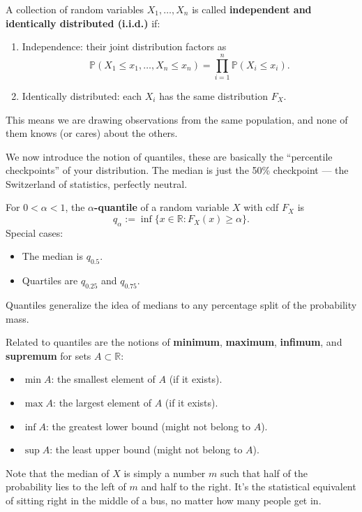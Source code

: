 \begin{definition}
A collection of random variables $X_1,\dots,X_n$ is called \textbf{independent and identically distributed (i.i.d.)} if:
\begin{enumerate}
\item Independence: their joint distribution factors as
\[
\mathbb{P}(X_1 \leq x_1, \dots, X_n \leq x_n) = \prod_{i=1}^n \mathbb{P}(X_i \leq x_i).
\]
\item Identically distributed: each $X_i$ has the same distribution $F_X$.
\end{enumerate}
This means we are drawing observations from the same population, and none of them knows (or cares) about the others. 
\end{definition}

We now introduce the notion of quantiles, these are basically the “percentile checkpoints” of your distribution. The median is just the 50\% checkpoint — the Switzerland of statistics, perfectly neutral.

\begin{definition}
For $0 < \alpha < 1$, the \textbf{$\alpha$-quantile} of a random variable $X$ with cdf $F_X$ is
\[
q_\alpha := \inf\{x \in \mathbb{R} : F_X(x) \geq \alpha\}.
\]
Special cases:
\begin{itemize}
\item The median is $q_{0.5}$.
\item Quartiles are $q_{0.25}$ and $q_{0.75}$.
\end{itemize}
Quantiles generalize the idea of medians to any percentage split of the probability mass.

Related to quantiles are the notions of \textbf{minimum}, \textbf{maximum}, \textbf{infimum}, and \textbf{supremum} for sets $A \subset \mathbb{R}$:
\begin{itemize}
\item $\min A$: the smallest element of $A$ (if it exists).
\item $\max A$: the largest element of $A$ (if it exists).
\item $\inf A$: the greatest lower bound (might not belong to $A$).
\item $\sup A$: the least upper bound (might not belong to $A$).
\end{itemize}

Note that the median of $X$ is simply a number $m$ such that half of the probability lies to the left of $m$ and half to the right. 
It’s the statistical equivalent of sitting right in the middle of a bus, no matter how many people get in.
\end{definition}

